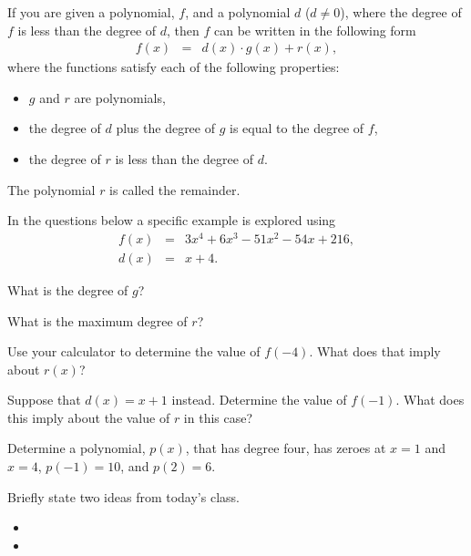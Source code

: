 \begin{problem}
  If you are given a polynomial, $f$, and a polynomial $d$ ($d \neq 0$), where the
  degree of $f$ is less than the degree of $d$, then $f$ can be
  written in the following form
  \begin{eqnarray*}
    f(x) & = & d(x)\cdot g(x) + r(x),
  \end{eqnarray*}
  where the functions satisfy each of the following properties:
  \begin{itemize}
  \item $g$ and $r$ are polynomials,
  \item the degree of $d$ plus the degree of $g$ is equal to the
    degree of $f$,
  \item the degree of $r$ is less than the degree of $d$.
  \end{itemize}
  The polynomial $r$ is called the remainder.

  In the questions below a specific example is explored using
  \begin{eqnarray*}
    f(x) & = & 3x^4+6x^3-51x^2-54x+216, \\
    d(x) & = & x+4.
  \end{eqnarray*}
  \begin{subproblem}
  \item What is the degree of $g$?

    \vfill

  \item What is the maximum degree of $r$?

    \vfill

  \item Use your calculator to determine the value of $f(-4)$. What
    does that imply about $r(x)$?

    \vfill

  \item Suppose that $d(x)=x+1$ instead. Determine the value of
    $f(-1)$. What does this imply about the value of $r$ in this case?

    \vfill
    
  \end{subproblem}

  \clearpage

\item Determine a polynomial, $p(x)$, that has degree four, has zeroes at $x=1$
  and $x=4$, $p(-1)=10$, and $p(2)=6$.

  \vfill

\end{problem}

\postClass

\begin{problem}
\item Briefly state two ideas from today's class.
  \begin{itemize}
  \item 
  \item 
  \end{itemize}
\item 
  \begin{subproblem}
    \item
  \end{subproblem}
\end{problem}



